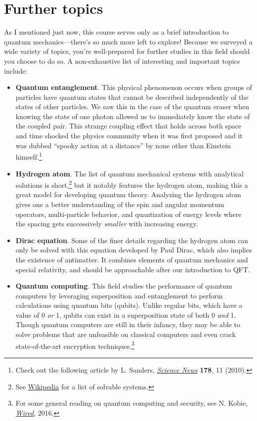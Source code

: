 \section{Further topics} \label{sec:further}
As I mentioned just now, this course serves only as a brief introduction to quantum mechanics---there's so much more left to explore! Because we surveyed a wide variety of topics, you're well-prepared for further studies in this field should you choose to do so. A non-exhaustive list of interesting and important topics include:

\begin{itemize}
\item \textbf{Quantum entanglement}. This physical phenomenon occurs when groups of particles have quantum states that cannot be described independently of the states of other particles. We saw this in the case of the quantum eraser when knowing the state of one photon allowed us to immediately know the state of the coupled pair. This strange coupling effect that holds across both space and time shocked the physics community when it was first proposed and it was dubbed ``spooky action at a distance'' by none other than Einstein himself.\footnote{Check out the following article by L. Sanders, \href{https://www.sciencenews.org/article/everyday-entanglement}{\emph{Science News}} \textbf{178}, 11 (2010).}

\item \textbf{Hydrogen atom}. The list of quantum mechanical systems with analytical solutions is short,\footnote{See \href{https://en.wikipedia.org/wiki/List_of_quantum-mechanical_systems_with_analytical_solutions}{Wikipedia} for a list of solvable systems.} but it notably features the hydrogen atom, making this a great model for developing quantum theory. Analyzing the hydrogen atom gives one a better understanding of the spin and angular momentum operators, multi-particle behavior, and quantization of energy levels where the spacing gets successively \emph{smaller} with increasing energy.

\item \textbf{Dirac equation}. Some of the finer details regarding the hydrogen atom can only be solved with this equation developed by Paul Dirac, which also implies the existence of antimatter. It combines elements of quantum mechanics and special relativity, and should be approachable after our introduction to QFT.

\item \textbf{Quantum computing}. This field studies the performance of quantum computers by leveraging superposition and entanglement to perform calculations using quantum bits (qubits). Unlike regular bits, which have a value of 0 \emph{or} 1, qubits can exist in a superposition state of both 0 \emph{and} 1. Though quantum computers are still in their infancy, they may be able to solve problems that are unfeasible on classical computers and even crack state-of-the-art encryption techniques.\footnote{For some general reading on quantum computing and security, see N. Kobie, \href{http://www.wired.co.uk/article/quantum-computers-quantum-security-encryption}{\emph{Wired}}, 2016.}
\end{itemize}

